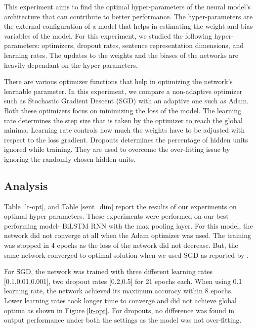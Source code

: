 \documentclass[12pt]{report} %
\begin{document}
This experiment aims to find the optimal hyper-parameters of the neural model's architecture that can contribute to better performance. The hyper-parameters are the external configuration of a model that helps in estimating the weight and bias variables of the model. For this experiment, we studied the following hyper-parameters: optimizers, dropout rates, sentence representation dimensions, and learning rates. The updates to the  weights and the biases of the networks are heavily dependant on the hyper-parameters.

There are various optimizer functions that help in optimizing the network's learnable parameter. In this experiment, we compare a non-adaptive optimizer such as Stochastic Gradient Descent (SGD) with an adaptive one such as Adam. Both these optimizers focus on minimizing the loss of the model. The learning rate determines the step size that is taken by the optimizer to reach the global minima. Learning rate controls how much the weights have to be adjusted with respect to the loss gradient. Dropouts determines the percentage of hidden units ignored while training. They are used to overcome the over-fitting issue by ignoring the randomly chosen hidden units.

\subsection{Analysis}

Table \ref{lr-opt}, and Table \ref{sent_dim} report the results of our experiments on optimal hyper parameters. These experiments were performed on our best performing model- BiLSTM RNN with the max pooling layer. For this model, the network did not converge at all when the Adam optimizer was used. The training was stopped in 4 epochs as the loss of the network did not decrease.  But, the same network converged to optimal solution when we used SGD as reported by \cite{conneau2017supervised}. 

For SGD, the network was trained with three different learning rates [0.1,0.01,0.001], two dropout rates [0.2,0.5] for 21 epochs each. When using 0.1 learning rate,  the network achieved its maximum accuracy within 8 epochs. Lower learning rates took longer time to converge and did not achieve global optima as shown in Figure \ref{lr-opt}. For dropouts, no difference was found in output performance under both the settings as the model was not over-fitting.

%
\end{document}
